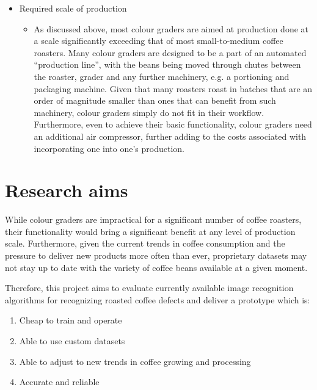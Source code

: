 \begin{itemize}
	\item Required scale of production
		\begin{itemize}
			\item As discussed above, most colour graders are aimed at production done
				at a scale significantly exceeding that of most small-to-medium coffee
				roasters.
				Many colour graders are designed to be a part of an automated ``production
				line'', with the beans being moved through chutes between the roaster, grader
				and any further machinery, e.g. a portioning and packaging machine.
				Given that many roasters roast in batches that are an order of magnitude
				smaller than ones that can benefit from such machinery, colour graders simply
				do not fit in their workflow.
				Furthermore, even to achieve their basic functionality,
				colour graders need an additional air compressor, further adding to the costs
				associated with incorporating one into one's production.
		\end{itemize}
\end{itemize}

\section{Research aims}
\label{sec:research-aims}
While colour graders are impractical for a significant
number of coffee roasters, their functionality would bring a significant benefit
at any level of production scale.
Furthermore, given the current trends in coffee
consumption and the pressure to deliver new products more often than ever,
proprietary datasets may not stay up to date with the variety of coffee beans available at
a given moment.

Therefore, this project aims to evaluate currently available image recognition algorithms
for recognizing roasted coffee defects and deliver a prototype which is:
\begin{enumerate}
	\item \label{itm:goal1} Cheap to train and operate

	\item \label{itm:goal2} Able to use custom datasets

	\item \label{itm:goal3} Able to adjust to new trends in coffee growing and processing

	\item \label{itm:goal4} Accurate and reliable
\end{enumerate}

